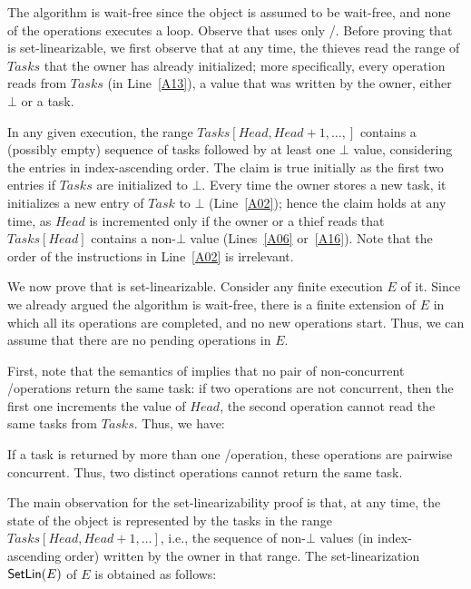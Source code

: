 \begin{thesisproof}

The algorithm is wait-free since the \MaxReg object is assumed to be wait-free, and none of the operations executes a loop. Observe that \Put uses only \R/\W. Before proving that \WFWSM is set-linearizable, we first observe that at any time, the thieves read the range of \(Tasks\) that the owner has already initialized; more specifically, every \Steal operation reads from \(Tasks\) (in Line~\ref{A13}), a value that was written by the owner, either \(\bot\) or a task.

In any given execution, the range \(Tasks[Head, Head+1, \hdots, ]\) contains a (possibly empty) sequence of tasks followed by at least one \(\bot\) value, considering the entries in index-ascending order. The claim is true initially as the first two entries if \(Tasks\) are initialized to \(\bot\). Every time the owner stores a new task, it initializes a new entry of \(Task\) to \(\bot\) (Line~\ref{A02}); hence the claim holds at any time, as \(Head\) is incremented only if the owner or a thief reads that \(Tasks[Head]\) contains a non-\(\bot\) value (Lines~\ref{A06} or~\ref{A16}).  Note that the order of the instructions in Line~\ref{A02} is irrelevant.

We now prove that \WFWSM is set-linearizable. Consider any finite execution \(E\) of it. Since we already argued the algorithm is wait-free, there is a finite extension of \(E\) in which all its operations are completed, and no new operations start. Thus, we can assume that there are no pending operations in \(E\).

First, note that the semantics of \MaxW implies that no pair of non-concurrent \Take/\Steal operations return the same task: if two operations are not concurrent, then the first one increments the value of \(Head\), the second operation cannot read the same tasks from \(Tasks\). Thus, we have:

\begin{remark}\label{remark-concurrency}
If a task is returned by more than one \Take/\Steal operation, these operations are pairwise concurrent. Thus, two distinct \Take operations cannot return the same task.
\end{remark}


The main observation for the set-linearizability proof is that, at any time, the state of the object is represented by the tasks in the range \(Tasks[Head, Head+1, \hdots ]\), i.e., the sequence of non-\(\bot\) values (in index-ascending order) written by the owner in that range. The set-linearization \({\sf \small SetLin}(E)\) of \(E\) is obtained as follows:


\end{thesisproof}
